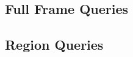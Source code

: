 \documentclass{paper}
\begin{document}
\subsection{Full Frame Queries}

\subsection{Region Queries}
\end{document}
